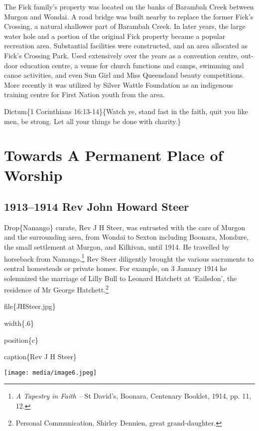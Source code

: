 The Fick family's property was located on the banks of Barambah Creek between Murgon and Wondai. A road bridge was built nearby to replace the former Fick's Crossing\emph{,} a natural shallower part of Barambah Creek. In later years, the large water hole and a portion of the original Fick property became a popular recreation area. Substantial facilities were constructed, and an area allocated as Fick's Crossing Park\emph{.} Used extensively over the years as a convention centre, out-door education centre, a venue for church functions and camps, swimming and canoe activities, and even Sun Girl and Miss Queensland beauty competitions. More recently it was utilized by Silver Wattle Foundation as an indigenous training centre for First Nation youth from the area.

Dictum\{1 Corinthians 16:13-14\}\{Watch ye, stand fast in the faith, quit you like men, be strong. Let all your things be done with charity.\}

\hypertarget{towards-a-permanent-place-of-worship}{%
\chapter{Towards A Permanent Place of Worship}\label{towards-a-permanent-place-of-worship}}

\hypertarget{rev-john-howard-steer}{%
\section{1913--1914 Rev John Howard Steer}\label{rev-john-howard-steer}}

Drop\{Nanango\} curate, Rev J H Steer, was entrusted with the care of Murgon and the surrounding area, from Wondai to Sexton including Boonara, Mondure, the small settlement at Murgon, and Kilkivan, until 1914. He travelled by horseback from Nanango.\footnote{\emph{A Tapestry in Faith --} St David's, Boonara, Centenary Booklet, 1914, pp. 11, 12.} Rev Steer diligently brought the various sacraments to central homesteads or private homes. For example, on 3 January 1914 he solemnized the marriage of Lilly Bull to Leonard Hatchett at `Eailsdon', the residence of Mr George Hatchett.\footnote{Personal Communication, Shirley Dennien, great grand-daughter.}

file\{JHSteer.jpg\}

width\{.6\}

position\{c\}

caption\{Rev J H Steer\}

\texttt{[image: media/image6.jpeg]}


